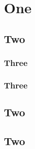 
\chapter{One}

\startcontents[chapters]

\minicontents

\spirals

\section{Two}
\lipsum[1]
\subsection{Three}
\lipsum[1]
\subsection{Three}
\section{Two}
\lipsum[1]
\section{Two}


\stopcontents[chapters]